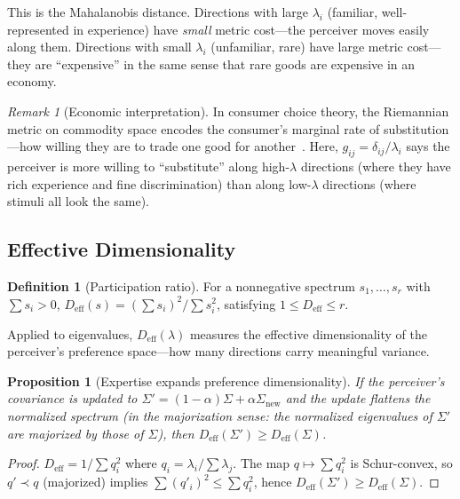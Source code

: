 \documentclass[journal]{IEEEtran}
\newtheorem{proposition}[theorem]{Proposition}
\theoremstyle{definition}
\newtheorem{definition}[theorem]{Definition}
\theoremstyle{remark}
\newtheorem{remark}[theorem]{Remark}
\begin{document}
This is the Mahalanobis distance.  Directions with large $\lambda_i$
(familiar, well-represented in experience) have \emph{small} metric
cost---the perceiver moves easily along them.  Directions with small
$\lambda_i$ (unfamiliar, rare) have large metric cost---they are
``expensive'' in the same sense that rare goods are expensive in an
economy.

\begin{remark}[Economic interpretation]
In consumer choice theory, the Riemannian metric on commodity space
encodes the consumer's marginal rate of substitution---how willing
they are to trade one good for another~\cite{debreu1972smooth}.
Here, $g_{ij} = \delta_{ij}/\lambda_i$ says the perceiver is more
willing to ``substitute'' along high-$\lambda$ directions (where
they have rich experience and fine discrimination) than along
low-$\lambda$ directions (where stimuli all look the same).
\end{remark}

\subsection{Effective Dimensionality}

\begin{definition}[Participation ratio]
For a nonnegative spectrum $s_1, \ldots, s_r$ with $\sum s_i > 0$,
$D_{\mathrm{eff}}(s) = (\sum s_i)^2 / \sum s_i^2$, satisfying
$1 \leq D_{\mathrm{eff}} \leq r$.
\end{definition}

Applied to eigenvalues, $D_{\mathrm{eff}}(\lambda)$ measures the
effective dimensionality of the perceiver's preference space---how
many directions carry meaningful variance.

\begin{proposition}[Expertise expands preference dimensionality]
\label{prop:expertise}
If the perceiver's covariance is updated to $\Sigma' = (1-\alpha)
\Sigma + \alpha\Sigma_{\mathrm{new}}$ and the update flattens the
normalized spectrum (in the majorization sense: the normalized
eigenvalues of $\Sigma'$ are majorized by those of $\Sigma$), then
$D_{\mathrm{eff}}(\Sigma') \geq D_{\mathrm{eff}}(\Sigma)$.
\end{proposition}

\begin{proof}
$D_{\mathrm{eff}} = 1/\sum q_i^2$ where $q_i = \lambda_i/\sum
\lambda_j$.  The map $q \mapsto \sum q_i^2$ is Schur-convex, so
$q' \prec q$ (majorized) implies $\sum (q'_i)^2 \leq \sum q_i^2$,
hence $D_{\mathrm{eff}}(\Sigma') \geq D_{\mathrm{eff}}(\Sigma)$.
\end{proof}
\end{document}
